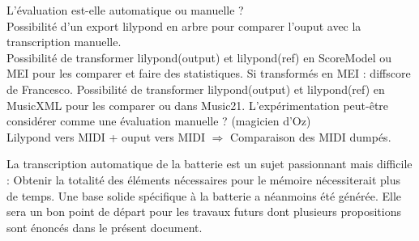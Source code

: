 \begin{itemize}
L’évaluation est-elle automatique ou manuelle ?\\
Possibilité d’un export lilypond en arbre pour comparer l’ouput avec la transcription manuelle.\\
Possibilité de transformer lilypond(output) et lilypond(ref) en ScoreModel ou MEI pour les comparer et faire des statistiques. Si transformés en MEI : diffscore de Francesco.
Possibilité de transformer lilypond(output) et lilypond(ref) en MusicXML pour les comparer ou dans Music21.
L’expérimentation peut-être considérer comme une évaluation manuelle ? (magicien d’Oz)\\
Lilypond vers MIDI + ouput vers MIDI $\Rightarrow$ Comparaison des MIDI dumpés.\\



\end{itemize}

La transcription automatique de la batterie est un sujet passionnant mais
difficile : Obtenir la totalité des éléments nécessaires pour le mémoire
nécessiterait plus de temps. Une base solide spécifique à la batterie a
néanmoins été générée. Elle sera un bon point de départ pour les travaux futurs
dont plusieurs propositions sont énoncés dans le présent document.
